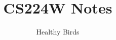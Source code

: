 \documentclass{report}
\begin{document}
\title{CS224W Notes}
\author{Healthy Birds}

\maketitle

\tableofcontents

\newpage




\end{document}
